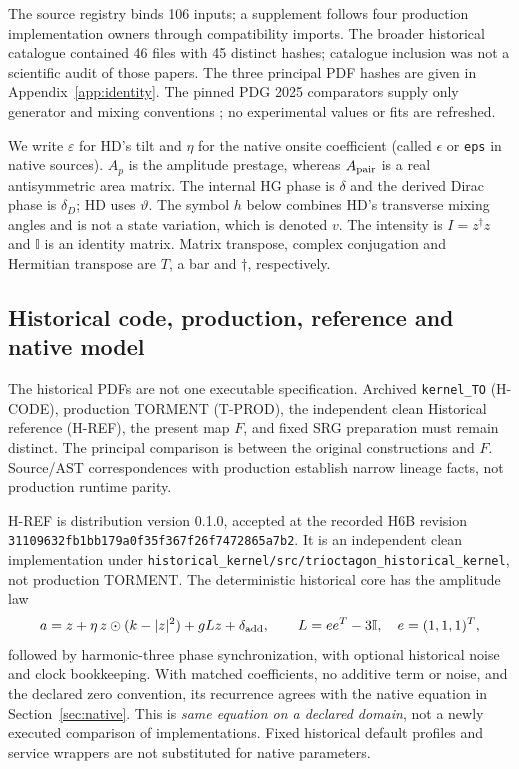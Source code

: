 \documentclass[11pt,a4paper]{article}
\numberwithin{equation}{section}
\newcommand{\I}{\mathbb I}\newcommand{\Argz}{\operatorname{Arg}_0}
\newcommand{\secref}[1]{Section~\ref{#1}}
\begin{document}
The source registry binds 106 inputs; a supplement follows four production implementation owners through compatibility imports. The broader historical catalogue contained 46 files with 45 distinct hashes; catalogue inclusion was not a scientific audit of those papers. The three principal PDF hashes are given in Appendix~\ref{app:identity}. The pinned PDG 2025 comparators supply only generator and mixing conventions \cite{pdgsu3,pdg}; no experimental values or fits are refreshed.

We write $\varepsilon$ for HD's tilt and $\eta$ for the native onsite coefficient (called $\epsilon$ or \texttt{eps} in native sources). $A_p$ is the amplitude prestage, whereas $A_{\rm pair}$ is a real antisymmetric area matrix. The internal HG phase is $\delta$ and the derived Dirac phase is $\delta_D$; HD uses $\vartheta$. The symbol $h$ below combines HD's transverse mixing angles and is not a state variation, which is denoted $v$. The intensity is $I=z^\dagger z$ and $\I$ is an identity matrix. Matrix transpose, complex conjugation and Hermitian transpose are $T$, a bar and $\dagger$, respectively.

\subsection{Historical code, production, reference and native model}\label{sec:lineage}
The historical PDFs are not one executable specification. Archived \texttt{kernel\_TO} (H-CODE), production TORMENT (T-PROD), the independent clean Historical reference (H-REF), the present map $F$, and fixed SRG preparation must remain distinct. The principal comparison is between the original constructions and $F$. Source/AST correspondences with production establish narrow lineage facts, not production runtime parity.

H-REF is distribution version 0.1.0, accepted at the recorded H6B revision \nolinkurl{31109632fb1bb179a0f35f367f26f7472865a7b2}. It is an independent clean implementation under \nolinkurl{historical_kernel/src/trioctagon_historical_kernel}, not production TORMENT. The deterministic historical core has the amplitude law
\begin{equation}
 a=z+\eta\,z\odot(k-|z|^2)+gLz+\delta_{\rm add},\qquad L=ee^T-3\I,\quad e=(1,1,1)^T,
\end{equation}
followed by harmonic-three phase synchronization, with optional historical noise and clock bookkeeping. With matched coefficients, no additive term or noise, and the declared zero convention, its recurrence agrees with the native equation in \secref{sec:native}. This is \emph{same equation on a declared domain}, not a newly executed comparison of implementations. Fixed historical default profiles and service wrappers are not substituted for native parameters.
\end{document}

